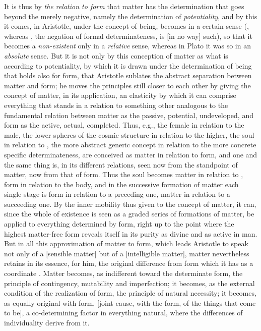 It is thus by \emph{the relation to form} that matter
has the determination that goes beyond the merely negative,
namely the determination of \emph{potentiality}, and by this it comes,
in Aristotle, under the concept of being, becomes in a certain sense  (, whereas , the negation of formal determinateness,
is  [in no way] such), so that it becomes a \emph{non-existent} only in a \emph{relative} sense, whereas in Plato it was
so in an \emph{absolute} sense.
But it is not only by this conception of matter as what is according to potentiality, by which
it is drawn under the determination of being that holds also for form,
that Aristotle sublates the abstract separation
between matter and form; he moves the principles still
closer to each other by giving the concept of matter, in its application,
an elasticity by which it can comprise everything
that stands in a relation to something other analogous to the fundamental relation between matter as the passive, potential, undeveloped,
and form as the active, actual, completed. Thus,
e.g., the female in relation to the male,
the lower spheres of the cosmic structure in relation to the higher,
the soul in relation to , the more abstract generic concept in relation to the more concrete specific determinateness, are conceived as matter in relation to
form, and one and the same thing is, in its different relations, seen now from the standpoint of matter, now from that of form. Thus the soul becomes matter in relation to , form
in relation to the body, and in the successive formation of matter each
single stage is form in relation to a preceding one, matter in relation
to a succeeding one. By the inner mobility thus
given to the concept of matter, it can, since the whole of existence is seen
as a graded series of formations of matter, be applied to everything
determined by form, right up to the point where the highest matter-free
form reveals itself in its purity as divine 
and as active  in man. But in all this approximation of matter to form, which leads Aristotle to
speak not only of a  [sensible matter] but of a  [intelligible matter], matter nevertheless retains in its essence, for him, the original
difference from form which it has as a coordinate . Matter
becomes, as indifferent toward the determinate form, the principle of contingency, mutability and imperfection; it
becomes, as the external condition of the realization of form,
the principle of natural necessity; it becomes, as equally original with form,  [joint cause, with the form, of the things that come to be],
a co-determining factor in everything natural, where the differences of individuality derive from it.

